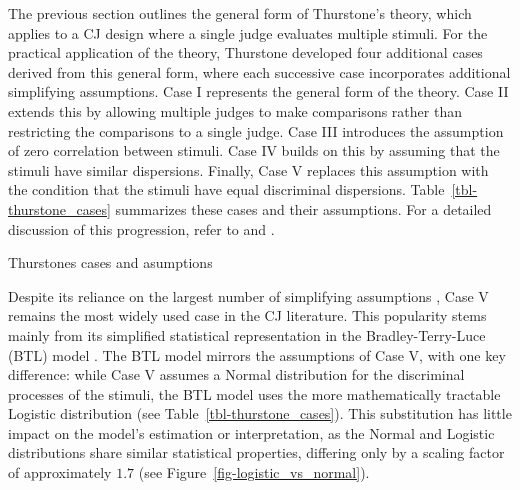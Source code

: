 \documentclass[
  authoryear,
  preprint,
  1p]{elsarticle}
\begin{document}
The previous section outlines the general form of Thurstone's theory,
which applies to a CJ design where a single judge evaluates multiple
stimuli. For the practical application of the theory, Thurstone
developed four additional cases derived from this general form, where
each successive case incorporates additional simplifying assumptions.
Case I represents the general form of the theory. Case II extends this
by allowing multiple judges to make comparisons rather than restricting
the comparisons to a single judge. Case III introduces the assumption of
zero correlation between stimuli. Case IV builds on this by assuming
that the stimuli have similar dispersions. Finally, Case V replaces this
assumption with the condition that the stimuli have equal discriminal
dispersions. Table~\ref{tbl-thurstone_cases} summarizes these cases and
their assumptions. For a detailed discussion of this progression, refer
to \citet{Thurstone_1927b} and \citet[pp.~248-253]{Bramley_2008}.

\begin{table}

\caption{\label{tbl-thurstone_cases}Thurstones cases and asumptions}


\end{table}%

Despite its reliance on the largest number of simplifying assumptions
\citetext{\citealp[pp.~253]{Bramley_2008}; \citealp[pp.~677]{Kelly_et_al_2022}},
Case V remains the most widely used case in the CJ literature. This
popularity stems mainly from its simplified statistical representation
in the Bradley-Terry-Luce (BTL) model
\citep{Bradley_et_al_1952, Luce_1959}. The BTL model mirrors the
assumptions of Case V, with one key difference: while Case V assumes a
Normal distribution for the discriminal processes of the stimuli, the
BTL model uses the more mathematically tractable Logistic distribution
\citep[pp.~254]{Andrich_1978, Bramley_2008} (see
Table~\ref{tbl-thurstone_cases}). This substitution has little impact on
the model's estimation or interpretation, as the Normal and Logistic
distributions share similar statistical properties, differing only by a
scaling factor of approximately \(1.7\)
\citep[pp.~16]{vanderLinden_et_al_2017_I} (see
Figure~\ref{fig-logistic_vs_normal}).
\end{document}
